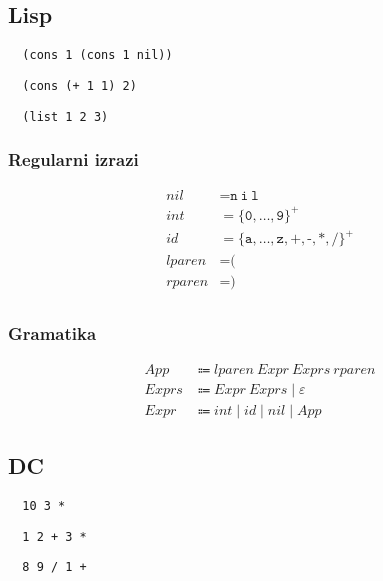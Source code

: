 \documentclass{report}
\newcommand{\Null}{\varepsilon}
\newcommand{\Char}[1]{\texttt{#1}}
\newcommand{\Spc}{\ }
\newcommand{\Union}{\mathrel{|}}
\newcommand{\KleenePlus}[1]{#1^+}
\newcommand{\Arrow}{\Coloneq}
\newcommand{\NT}[1]{{#1}}
\newcommand{\T}[1]{{#1}}
\begin{document}
\subsection{Lisp}
\begin{verbatim}
  (cons 1 (cons 1 nil))
\end{verbatim}
\begin{verbatim}
  (cons (+ 1 1) 2)
\end{verbatim}
\begin{verbatim}
  (list 1 2 3)
\end{verbatim}

\subsubsection*{Regularni izrazi}
\begin{equation*}
  \begin{aligned}
    \T{nil} &= \Char{n} \Spc \Char{i} \Spc \Char{l}\\
    \T{int} &= \KleenePlus{\{\Char{0}, \dots, \Char{9}\}}\\
    \T{id} &= \KleenePlus{\{\Char{a}, \dots, \Char{z}, \Char{+}, \Char{-}, \Char{*}, \Char{/} \}}\\
    \T{lparen} &= \Char{(}\\
    \T{rparen} &= \Char{)}\\
  \end{aligned}
\end{equation*}

\subsubsection*{Gramatika}
\begin{equation*}
  \begin{aligned}
    \NT{App} &\Arrow \T{lparen} \Spc \NT{Expr} \Spc \NT{Exprs} \Spc \T{rparen}\\
    \NT{Exprs} &\Arrow \NT{Expr} \Spc \NT{Exprs} \Union \Null\\
    \NT{Expr} &\Arrow \T{int} \Union \T{id} \Union \T{nil} \Union \NT{App}
  \end{aligned}
\end{equation*}

\subsection{DC}
\begin{verbatim}
  10 3 *
\end{verbatim}
\begin{verbatim}
  1 2 + 3 *
\end{verbatim}
\begin{verbatim}
  8 9 / 1 +
\end{verbatim}
\end{document}
